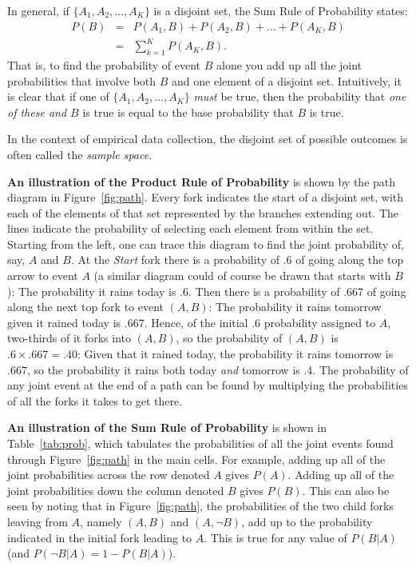 In general, if $\{A_1, A_2, \ldots, A_K\}$ is a disjoint set, the Sum Rule of Probability states:
\begin{equation}
\begin{array}{rcl}
P(B) &=&P(A_1,B)+P(A_2,B)+\ldots+P(A_K,B)\\ &=&\displaystyle\sum_{k=1}^K P(A_K,B).
\label{eq:sumrule}
\end{array}
\end{equation}
That is, to find the probability of event $B$ alone you add up all the joint probabilities that involve both $B$ and one element of a disjoint set. Intuitively, it is clear that if one of $\{A_1, A_2, \ldots, A_K\}$ \emph{must} be true, then the probability that \emph{one of these and $B$} is true is equal to the base probability that $B$ is true. 

In the context of empirical data collection, the disjoint set of possible outcomes is often called the \emph{sample space}.

\textbf{An illustration of the Product Rule of Probability} is shown by the path diagram in Figure~\ref{fig:path}. Every fork indicates the start of a disjoint set, with each of the elements of that set represented by the branches extending out. The lines indicate the probability of selecting each element from within the set. Starting from the left, one can trace this diagram to find the joint probability of, say, $A$ and $B$. At the \emph{Start} fork there is a probability of .6 of going along the top arrow to event $A$ (a similar diagram could of course be drawn that starts with $B$): The probability it rains today is .6. Then there is a probability of .667 of going along the next top fork to event $(A,B)$: The probability it rains tomorrow given it rained today is .667. Hence, of the initial .6 probability assigned to $A$, two-thirds of it forks into $(A,B)$, so the probability of $(A,B)$ is $.6 \times .667 = .40$: Given that it rained today, the probability it rains tomorrow is $.667$, so the probability it rains both today \textit{and} tomorrow is .4. The probability of any joint event at the end of a path can be found by multiplying the probabilities of all the forks it takes to get there.

\textbf{An illustration of the Sum Rule of Probability} is shown in Table~\ref{tab:prob}, which tabulates the probabilities of all the joint events found through Figure~\ref{fig:path} in the main cells. For example, adding up all of the joint probabilities across the row denoted $A$ gives $P(A)$. Adding up all of the joint probabilities down the column denoted $B$ gives $P(B)$. This can also be seen by noting that in Figure~\ref{fig:path}, the probabilities of the two child forks leaving from $A$, namely $(A,B)$ and $(A,\neg B)$, add up to the probability indicated in the initial fork leading to $A$. This is true for any value of $P(B|A)$ (and $P(\neg B|A) = 1 - P(B|A)$).

